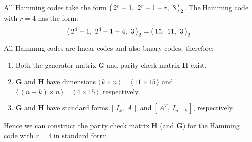 \documentclass{CUNY-assignment}
\begin{document}
%

All Hamming codes take the form $\boldsymbol{\bigl(\bigr.}\,2^{r} - 1,~2^{r} - 1 - r,~3\,\boldsymbol{\bigl.\bigr)}_{2}$.
The Hamming code with $r=4$ has the form:
\[ \boldsymbol{\bigl(\bigr.}\,2^{4} - 1,~2^{4} - 1 - 4,~3\,\boldsymbol{\bigl.\bigr)}_{2} = \boldsymbol{\bigl(\bigr.}\,15,~11,~3\,\boldsymbol{\bigl.\bigr)}_{2} \]

All Hamming codes are linear codes and also binary codes, therefore:

\begin{enumerate}

	\item Both the generator matrix $\mathbf{G}$ and parity check matrix $\mathbf{H}$ exist.

	\item $\mathbf{G}$ and $\mathbf{H}$ have dimensions $\langle\, k \times n \,\rangle = \langle\, 11 \times 15 \,\rangle$ and $\langle\, (n - k) \times n \,\rangle = \langle\, 4 \times 15 \,\rangle$, respectively.
	
	\item $\mathbf{G}$ and $\mathbf{H}$ have standard forms $\left[\,I_k,\:A\,\right]$ and $\left[\,A^{T},\:I_{n-k}\,\right]$, respectively.

\end{enumerate}

Hence we can construct the parity check matrix $\mathbf{H}$ (and $\mathbf{G}$) for the Hamming code with $r=4$ in standard form:
\end{document}
